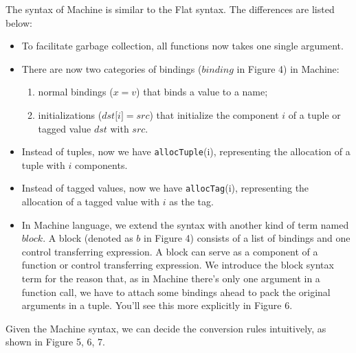 \documentclass{article}
\theoremstyle{definition}
\theoremstyle{remark}
\numberwithin{equation}{section}
\begin{document}
The syntax of Machine is similar to the Flat syntax. The differences are listed below:
\begin{itemize}
  \item To facilitate garbage collection, all functions now takes one single argument.
  \item There are now two categories of bindings ($binding$ in Figure 4) in Machine:
  \begin{enumerate}
    \item normal bindings ($x=v$) that binds a value to a name;
    \item initializations ($dst\texttt{[}i\texttt{]}=src$) that initialize the component
     $i$ of a tuple or tagged value $dst$ with $src$.
  \end{enumerate}
  \item Instead of tuples, now we have \texttt{allocTuple}(i), representing the allocation
  of a tuple with $i$ components.
  \item Instead of tagged values, now we have \texttt{allocTag}(i), representing the
  allocation of a tagged value with $i$ as the tag.
  \item In Machine language, we extend the syntax with another kind of term named $block$.
  A block (denoted as $b$ in Figure 4) consists of a list of bindings and one control
  transferring expression. A block can serve as a component of a function or control
  transferring expression. We introduce the block syntax term for the reason that, as
  in Machine there's only one argument in a function call, we have to attach some bindings
  ahead to pack the original arguments in a tuple. You'll see this more explicitly in
  Figure 6.
\end{itemize}

Given the Machine syntax, we can decide the conversion rules intuitively, as
shown in Figure 5, 6, 7.
\end{document}

